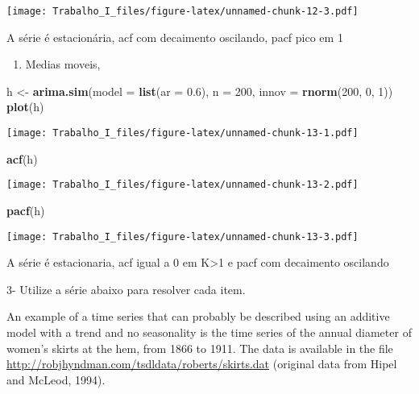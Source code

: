 \documentclass[]{article}
\newenvironment{Shaded}{\begin{snugshade}}{\end{snugshade}}
\newcommand{\KeywordTok}[1]{\textcolor[rgb]{0.13,0.29,0.53}{\textbf{#1}}}
\newcommand{\DataTypeTok}[1]{\textcolor[rgb]{0.13,0.29,0.53}{#1}}
\newcommand{\DecValTok}[1]{\textcolor[rgb]{0.00,0.00,0.81}{#1}}
\newcommand{\FloatTok}[1]{\textcolor[rgb]{0.00,0.00,0.81}{#1}}
\newcommand{\StringTok}[1]{\textcolor[rgb]{0.31,0.60,0.02}{#1}}
\newcommand{\NormalTok}[1]{#1}
\providecommand{\tightlist}{%
  \setlength{\itemsep}{0pt}\setlength{\parskip}{0pt}}
\begin{document}
\texttt{[image: Trabalho\_I\_files/figure-latex/unnamed-chunk-12-3.pdf]}

A série é estacionária, acf com decaimento oscilando, pacf pico em 1

\begin{enumerate}
\def\labelenumi{\alph{enumi})}
\setcounter{enumi}{7}
\tightlist
\item
  Medias moveis,
\end{enumerate}

\begin{Shaded}
\begin{Highlighting}[]
\NormalTok{h <-}\StringTok{ }\KeywordTok{arima.sim}\NormalTok{(}\DataTypeTok{model =} \KeywordTok{list}\NormalTok{(}\DataTypeTok{ar =} \FloatTok{0.6}\NormalTok{), }\DataTypeTok{n =} \DecValTok{200}\NormalTok{, }\DataTypeTok{innov =} \KeywordTok{rnorm}\NormalTok{(}\DecValTok{200}\NormalTok{, }\DecValTok{0}\NormalTok{, }\DecValTok{1}\NormalTok{))}
\KeywordTok{plot}\NormalTok{(h)}
\end{Highlighting}
\end{Shaded}

\texttt{[image: Trabalho\_I\_files/figure-latex/unnamed-chunk-13-1.pdf]}

\begin{Shaded}
\begin{Highlighting}[]
\KeywordTok{acf}\NormalTok{(h)}
\end{Highlighting}
\end{Shaded}

\texttt{[image: Trabalho\_I\_files/figure-latex/unnamed-chunk-13-2.pdf]}

\begin{Shaded}
\begin{Highlighting}[]
\KeywordTok{pacf}\NormalTok{(h)}
\end{Highlighting}
\end{Shaded}

\texttt{[image: Trabalho\_I\_files/figure-latex/unnamed-chunk-13-3.pdf]}

A série é estacionaria, acf igual a 0 em K\textgreater{}1 e pacf com
decaimento oscilando

3- Utilize a série abaixo para resolver cada item.

An example of a time series that can probably be described using an
additive model with a trend and no seasonality is the time series of the
annual diameter of women's skirts at the hem, from 1866 to 1911. The
data is available in the file
\url{http://robjhyndman.com/tsdldata/roberts/skirts.dat} (original data
from Hipel and McLeod, 1994).
\end{document}
